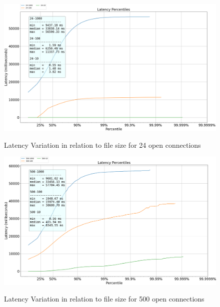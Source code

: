 \documentclass[runningheads]{llncs}
\begin{document}
\vspace{-2em}
\begin{figure}
    \centering
    \begin{minipage}{0.49\textwidth}
        \centering\vspace{-2em}
        \includegraphics[width=1\textwidth]{plotcon24.png}\vspace{-2em}
        \caption{Latency Variation in relation to file size for 24 open connections}\vspace{-1.5em}
		\label {fig:latency-to-size-24}
    \end{minipage}\hfill
    \begin{minipage}{0.49\textwidth}
        \centering\vspace{-2em}
        \includegraphics[width=1\textwidth]{plotcon500.png}\vspace{-2em}
        \caption{Latency Variation in relation to file size for 500 open connections}\vspace{-1.5em}
		\label {fig:latency-to-size-500}
    \end{minipage}
\end{figure}
\end{document}
